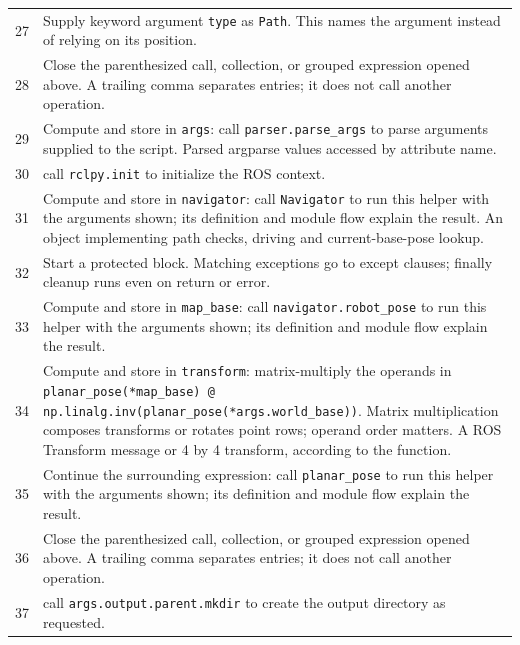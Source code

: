 \documentclass[11pt,a4paper]{book}
\begin{document}
\begin{longtable}{r p{}}
27 & Supply keyword argument \texttt{type} as \texttt{Path}. This names the argument instead of relying on its position. \\

28 & Close the parenthesized call, collection, or grouped expression opened above. A trailing comma separates entries; it does not call another operation. \\

29 & Compute and store in \texttt{args}: call \texttt{parser.parse\_args} to parse arguments supplied to the script. Parsed argparse values accessed by attribute name. \\

30 & call \texttt{rclpy.init} to initialize the ROS context. \\

31 & Compute and store in \texttt{navigator}: call \texttt{Navigator} to run this helper with the arguments shown; its definition and module flow explain the result. An object implementing path checks, driving and current-base-pose lookup. \\

32 & Start a protected block. Matching exceptions go to except clauses; finally cleanup runs even on return or error. \\

33 & Compute and store in \texttt{map\_base}: call \texttt{navigator.robot\_pose} to run this helper with the arguments shown; its definition and module flow explain the result.  \\

34 & Compute and store in \texttt{transform}: matrix-multiply the operands in \texttt{planar\_pose(*map\_base) @ np.linalg.inv(planar\_pose(*args.world\_base))}. Matrix multiplication composes transforms or rotates point rows; operand order matters. A ROS Transform message or 4 by 4 transform, according to the function. \\

35 & Continue the surrounding expression: call \texttt{planar\_pose} to run this helper with the arguments shown; its definition and module flow explain the result. \\

36 & Close the parenthesized call, collection, or grouped expression opened above. A trailing comma separates entries; it does not call another operation. \\

37 & call \texttt{args.output.parent.mkdir} to create the output directory as requested. \\


\end{longtable}
\end{document}
